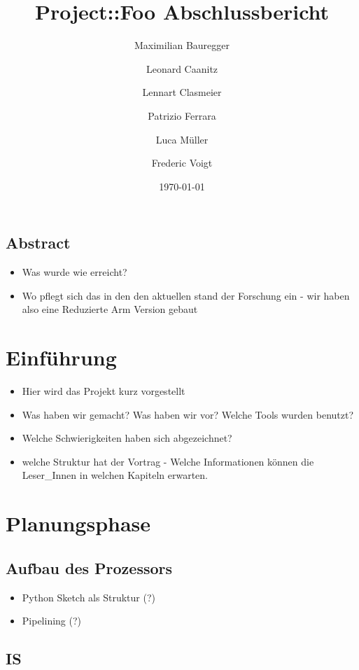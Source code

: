\documentclass[paper=a4,fontsize=12pt]{scrreprt}
\title{Project::Foo Abschlussbericht}
\author{Maximilian Bauregger \and Leonard Caanitz \and Lennart Clasmeier \and Patrizio Ferrara \and Luca Müller \and Frederic Voigt}
\date{\today}
\begin{document}
\maketitle

\tableofcontents

\section*{Abstract\textbf{}}

\begin{itemize}
    \item Was wurde wie erreicht?
    \item Wo pflegt sich das in den den aktuellen stand der Forschung ein - wir haben also eine Reduzierte Arm Version gebaut 
\end{itemize}
  

\chapter{Einführung}
\begin{itemize}
    \item Hier wird das Projekt kurz vorgestellt
    \item Was haben wir gemacht? Was haben wir vor? Welche Tools wurden benutzt?
    \item Welche Schwierigkeiten haben sich abgezeichnet?
    \item welche Struktur hat der Vortrag - Welche Informationen können die Leser\_Innen in welchen Kapiteln erwarten.
\end{itemize}

\chapter{Planungsphase}

\section{Aufbau des Prozessors}

\begin{itemize}
    \item Python Sketch als Struktur (?)
    \item Pipelining (?)
\end{itemize}


\section{IS}
\end{document}
